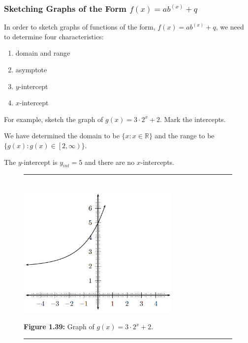             \subsubsection{ Sketching Graphs of the Form $f\left(x\right)=a{b}^{\left(x\right)}+q$}
            \nopagebreak
          \label{m39348*id252708}In order to sketch graphs of functions of the form, $f\left(x\right)=a{b}^{\left(x\right)}+q$, we need to determine four characteristics:\par 
          \label{m39348*id252753}\begin{enumerate}[noitemsep, label=\textbf{\arabic*}. ] 
            \label{m39348*uid193}\item domain and range
\label{m39348*id64532}\item asymptote
\label{m39348*uid194}\item $y$-intercept
\label{m39348*uid195}\item $x$-intercept
\end{enumerate}
          \label{m39348*id252808}For example, sketch the graph of $g\left(x\right)=3\ensuremath{\cdot}{2}^{x}+2$. Mark the intercepts.\par 
          \label{m39348*id252849}We have determined the domain to be $\{x:x\in \mathbb{R}\}$ and the range to be $\{g\left(x\right):g\left(x\right)\in \left[2,\infty \right)\}$.\par 
          \label{m39348*id252925}The $y$-intercept is ${y}_{int}=5$ and there are no $x$-intercepts.\par 
    \setcounter{subfigure}{0}
	\begin{figure}[H] %
    \begin{center}
    \rule[.1in]{\figurerulewidth}{.005in} \\
        \label{m39348*uid196!!!underscore!!!media}\label{m39348*uid196!!!underscore!!!printimage}\includegraphics[width=300px]{col11306.imgs/m39348_MG10C11_032.png} %
      \vspace{2pt}
    \vspace{\rubberspace}\par \begin{cnxcaption}
	  \small \textbf{Figure 1.39: }Graph of $g\left(x\right)=3\ensuremath{\cdot}{2}^{x}+2$.
	\end{cnxcaption}
    \vspace{.1in}
    \rule[.1in]{\figurerulewidth}{.005in} \\
    \end{center}
 \end{figure}       
